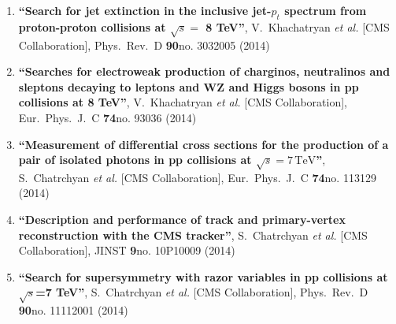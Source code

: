 \begin{enumerate}
\item%
{\bf ``Search for jet extinction in the inclusive jet-$p_t$ spectrum from proton-proton collisions at $\sqrt s =$ 8 TeV''}, 
  V.~Khachatryan {\it et al.}  [CMS Collaboration], 
Phys.\ Rev.\ D {\bf 90}no. 3032005 (2014) %


\item%
{\bf ``Searches for electroweak production of charginos, neutralinos and sleptons decaying to leptons and WZ and Higgs bosons in pp collisions at 8 TeV''}, 
  V.~Khachatryan {\it et al.}  [CMS Collaboration], 
Eur.\ Phys.\ J.\ C {\bf 74}no. 93036 (2014) %


\item%
{\bf ``Measurement of differential cross sections for the production of a pair of isolated photons in pp collisions at $\sqrt{s}=7\,\text {TeV} $''}, 
  S.~Chatrchyan {\it et al.}  [CMS Collaboration], 
Eur.\ Phys.\ J.\ C {\bf 74}no. 113129 (2014) %


\item%
{\bf ``Description and performance of track and primary-vertex reconstruction with the CMS tracker''}, 
  S.~Chatrchyan {\it et al.}  [CMS Collaboration], 
JINST {\bf 9}no. 10P10009 (2014) %


\item%
{\bf ``Search for supersymmetry with razor variables in pp collisions at $\sqrt{s}$=7 TeV''}, 
  S.~Chatrchyan {\it et al.}  [CMS Collaboration], 
Phys.\ Rev.\ D {\bf 90}no. 11112001 (2014) %



\end{enumerate}
